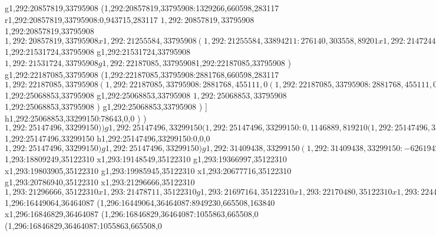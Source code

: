 {g1,292:20857819,33795908
(1,292:20857819,33795908:1329266,660598,283117
r1,292:20857819,33795908:0,943715,283117
$1,292:20857819,33795908
$1,292:20857819,33795908
$1,292:20857819,33795908
x1,292:21255584,33795908
(1,292:21255584,33894211:276140,303558,89201
x1,292:21472447,33894211
)
$1,292:21531724,33795908
g1,292:21531724,33795908
$1,292:21531724,33795908
g1,292:22187085,33795908
$1,292:22187085,33795908
)
g1,292:22187085,33795908
(1,292:22187085,33795908:2881768,660598,283117
$1,292:22187085,33795908
(1,292:22187085,33795908:2881768,455111,0
(1,292:22187085,33795908:2881768,455111,0
x1,292:25068853,33795908
)
)
$1,292:25068853,33795908
g1,292:25068853,33795908
$1,292:25068853,33795908
$1,292:25068853,33795908
)
g1,292:25068853,33795908
)
]
h1,292:25068853,33299150:78643,0,0
)
)
$1,292:25147496,33299150
)
)
g1,292:25147496,33299150
(1,292:25147496,33299150:0,1146889,819210
(1,292:25147496,33299150:0,0,0
$1,292:25147496,33299150
h1,292:25147496,33299150:0,0,0
$1,292:25147496,33299150
)
g1,292:25147496,33299150
)
g1,292:31409438,33299150
(1,292:31409438,33299150:-6261942,1146889,819210
)
g1,292:25147496,33299150
)
(1,294:10437920,35122310:20971518,491520,163840
x1,294:14012369,35122310
g1,293:14230822,35122310
x1,293:15290323,35122310
g1,293:15508776,35122310
x1,293:16823140,35122310
x1,293:17587729,35122310
g1,293:17806182,35122310
x1,293:18590796,35122310
g1,293:18809249,35122310
$1,293:18809249,35122310
x1,293:19148549,35122310
g1,293:19366997,35122310
x1,293:19803905,35122310
g1,293:19985945,35122310
x1,293:20677716,35122310
g1,293:20786940,35122310
x1,293:21296666,35122310
$1,293:21296666,35122310
x1,293:21478711,35122310
g1,293:21697164,35122310
x1,293:22170480,35122310
x1,293:22443546,35122310
g1,293:22661999,35122310
x1,293:23757909,35122310
g1,293:23976362,35122310
x1,293:24631723,35122310
x1,293:25651174,35122310
g1,293:25869627,35122310
x1,293:26779851,35122310
g1,293:26998304,35122310
x1,293:28658553,35122310
g1,293:28877006,35122310
x1,293:31249050,35122310
k1,294:31409438,35122310:160388
g1,294:31409438,35122310
)
(1,296:10437920,36464087:14960374,665508,235932
g1,296:16449064,36464087
(1,296:16449064,36464087:8949230,665508,235932
g1,296:16449064,36464087
(1,296:16449064,36464087:0,550500,235932
[1,296:16449064,36464087:0,550500,235932
(1,21:16449064,36464087:0,550500,235932
r1,296:16449064,36464087:0,786432,235932
)
]
)
(1,296:16449064,36464087:8949230,665508,163840
$1,296:16449064,36464087
(1,296:16449064,36464087:8949230,665508,163840
x1,296:16846829,36464087
(1,296:16846829,36464087:1055863,665508,0
(1,296:16846829,36464087:1055863,665508,0
}
